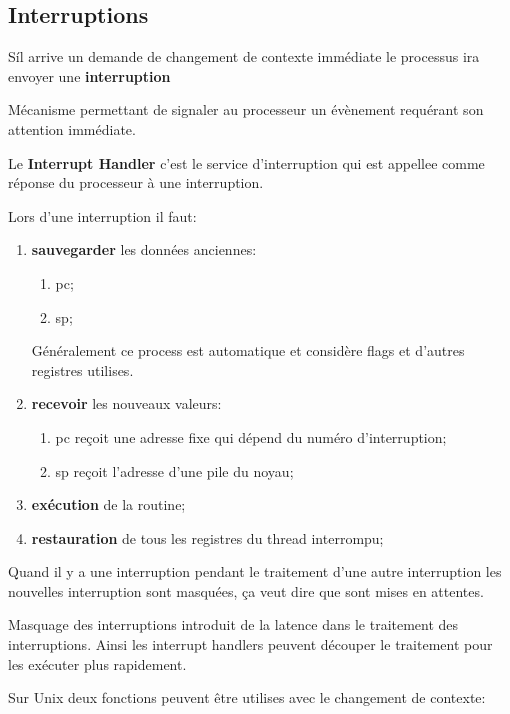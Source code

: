 \documentclass{article}
\begin{document}
\subsection{Interruptions}
Síl arrive un demande de changement de contexte immédiate le processus ira envoyer une \textbf{interruption}
\begin{definition}
    Mécanisme permettant de signaler au processeur un évènement requérant son attention immédiate.

    \begin{remark}
        Le \textbf{Interrupt Handler} c'est le service d'interruption qui est appellee comme réponse du processeur à une interruption.
    \end{remark}
\end{definition}
Lors d'une interruption il faut:
\begin{enumerate}[]
    \item \textbf{sauvegarder} les données anciennes:
    \begin{enumerate}[noitemsep]
        \item pc;
        \item sp;
    \end{enumerate}
    Généralement ce process est automatique et considère flags et d'autres registres utilises.

    \item \textbf{recevoir} les nouveaux valeurs:
    \begin{enumerate}[noitemsep]
        \item pc reçoit une adresse fixe qui dépend du numéro d'interruption;
        \item sp reçoit l'adresse d'une pile du noyau; 
    \end{enumerate}

    \item \textbf{exécution} de la routine;
    \item \textbf{restauration} de tous les registres du thread interrompu;
\end{enumerate}
Quand il y a une interruption pendant le traitement d'une autre interruption les nouvelles interruption sont masquées, ça veut dire que sont mises en attentes.
\begin{remark}
    Masquage des interruptions introduit de la latence dans le traitement des interruptions. Ainsi les interrupt handlers peuvent découper le traitement pour les exécuter plus rapidement.
\end{remark}
Sur Unix deux fonctions peuvent être utilises avec le changement de contexte:
\end{document}
